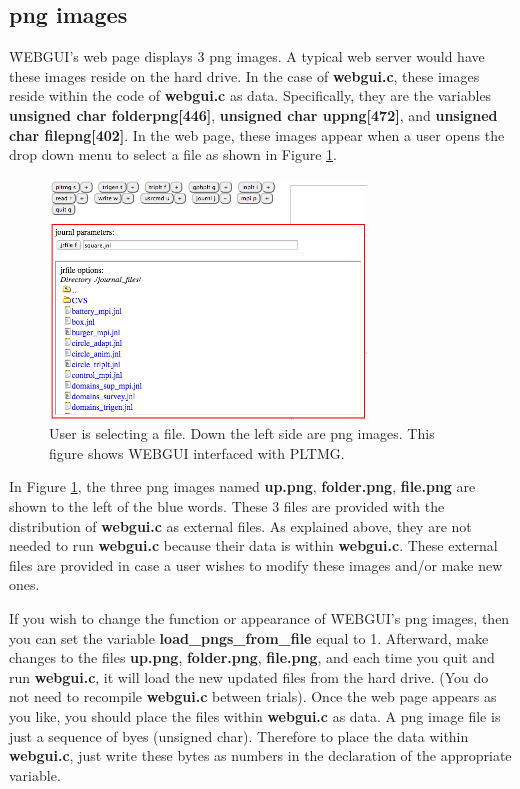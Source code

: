 \subsection{png images}
\f{WEBGUI}'s web page displays 3 png images. A typical web server would have these images reside on the hard drive.
In the case of \textbf{webgui.c}, these images reside within the code of \textbf{webgui.c} as data. Specifically, they are the variables
\textbf{unsigned char folderpng[446]}, \textbf{unsigned char uppng[472]}, and \textbf{unsigned char filepng[402]}. In the web page,
these images appear when a user opens the drop down menu to select a file as shown in Figure \ref{fig:7-1}.

\begin{figure}[H]
\centering
\includegraphics[width=0.75\textwidth]{pix/png.png}
\caption{User is selecting a file. Down the left side are png images. This figure shows WEBGUI interfaced with PLTMG.}
\label{fig:7-1}
\end{figure} 

In Figure \ref{fig:7-1}, the three png images named \textbf{up.png}, \textbf{folder.png}, \textbf{file.png} are shown to the left of the
blue words. These 3 files are provided with the distribution of \textbf{webgui.c} as external files. As explained above, they are not
needed to run \textbf{webgui.c} because their data is within \textbf{webgui.c}. These external files are provided in case a user
wishes to modify these images and/or make new ones.

If you wish to change the function or appearance of \f{WEBGUI}'s png images, then you can set the variable 
\textbf{load\_pngs\_from\_file} equal to 1. Afterward, make changes to the files \textbf{up.png}, \textbf{folder.png}, \textbf{file.png}, 
and each time you quit and run \textbf{webgui.c}, it will load 
the new updated files from the hard drive. (You do not need to recompile \textbf{webgui.c} between trials). Once the web page 
appears as you like, you should place the files within \textbf{webgui.c} as data. A png image 
file is just a sequence of byes (unsigned char). Therefore to place the data within \textbf{webgui.c}, just write these bytes as numbers 
in the declaration of the appropriate variable.

